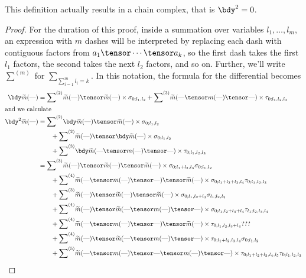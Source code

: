 \begin{lem}
This definition actually results in a chain complex, that is $\bdy^2 = 0$.
\end{lem}
\begin{proof}
\newcommand{\T}{\text{---}}
\newcommand{\ssum}[1]{{\sum}^{(#1)}}
For the duration of this proof, inside a summation over variables $l_1, \ldots, l_m$, an expression with $m$ dashes will be interpreted
by replacing each dash with contiguous factors from $a_1 \tensor \cdots \tensor a_k$, so the first dash takes the first $l_1$ factors, the second
takes the next $l_2$ factors, and so on. Further, we'll write $\ssum{m}$ for $\sum_{\sum_{i=1}^m l_i = k}$.
In this notation, the formula for the differential becomes
\begin{align}
\notag
\bdy \tm(\T) & = \ssum{2} \tm(\T) \tensor \tm(\T) \times \sigma_{0;l_1,l_2} + \ssum{3} \tm(\T \tensor m(\T) \tensor \T) \times \tau_{0;l_1,l_2,l_3} \\
\intertext{and we calculate}
\notag
\bdy^2 \tm(\T) & = \ssum{2} \bdy \tm(\T) \tensor \tm(\T) \times \sigma_{0;l_1,l_2} \\
\notag         & \qquad + \ssum{2} \tm(\T) \tensor \bdy \tm(\T) \times \sigma_{0;l_1,l_2} \\
\notag         & \qquad + \ssum{3} \bdy \tm(\T \tensor m(\T) \tensor \T) \times \tau_{0;l_1,l_2,l_3} \\
\label{eq:d21} & = \ssum{3} \tm(\T) \tensor \tm(\T) \tensor \tm(\T) \times \sigma_{0;l_1+l_2,l_3} \sigma_{0;l_1,l_2} \\
\label{eq:d22} & \qquad + \ssum{4} \tm(\T \tensor m(\T) \tensor \T) \tensor \tm(\T) \times \sigma_{0;l_1+l_2+l_3,l_4} \tau_{0;l_1,l_2,l_3} \\
\label{eq:d23} & \qquad + \ssum{3} \tm(\T) \tensor \tm(\T) \tensor \tm(\T) \times \sigma_{0;l_1,l_2+l_3} \sigma_{l_1;l_2,l_3} \\
\label{eq:d24} & \qquad + \ssum{4} \tm(\T) \tensor \tm(\T \tensor m(\T) \tensor \T) \times \sigma_{0;l_1,l_2+l_3+l_4} \tau_{l_1;l_2,l_3,l_4} \\
\label{eq:d25} & \qquad + \ssum{4} \tm(\T \tensor m(\T) \tensor \T) \tensor \tm(\T) \times \tau_{0;l_1,l_2,l_3+l_4} ??? \\
\label{eq:d26} & \qquad + \ssum{4} \tm(\T) \tensor \tm(\T \tensor m(\T) \tensor \T) \times \tau_{0;l_1+l_2,l_3,l_4} \sigma_{0;l_1,l_2} \\
\label{eq:d27} & \qquad + \ssum{5} \tm(\T \tensor m(\T) \tensor \T \tensor m(\T) \tensor \T) \times \tau_{0;l_1+l_2+l_3,l_4,l_5} \tau_{0;l_1,l_2,l_3}  \\

\end{align}
\end{proof}
